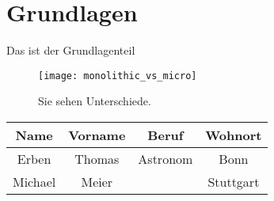 
\section{Grundlagen}
Das ist der Grundlagenteil

%
%

\begin{figure}[ht]
	\centering
	\texttt{[image: monolithic\_vs\_micro]}
	\caption{Sie sehen Unterschiede.\cite{irakli2016mic_arc}}
	\label{fig:trigo_funk}
\end{figure}

\begin{center}
	\begin{tabular}{|c|c|c|c|}
		Name & Vorname & Beruf & Wohnort \\
		\hline
		Erben & Thomas & Astronom & Bonn  \\
		Michael & Meier & & Stuttgart  \\
	\end{tabular}
\end{center}